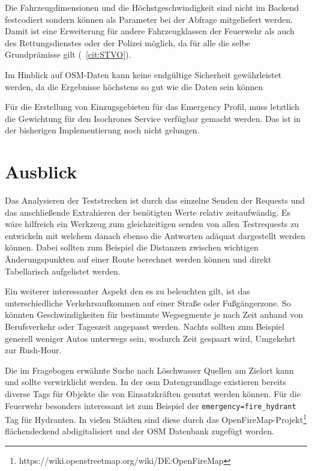 Die Fahrzeugdimensionen und die Höchstgeschwindigkeit sind nicht im Backend festcodiert sondern können als Parameter bei der Abfrage mitgeliefert werden.
Damit ist eine Erweiterung für andere Fahrzeugklassen der Feuerwehr als auch des Rettungsdienstes oder der Polizei möglich, da für alle die selbe Grundprämisse gilt (~\ref{cit:STVO}).

Im Hinblick auf OSM-Daten kann keine endgültige Sicherheit gewährleistet werden, da die Ergebnisse höchstens so gut wie die Daten sein können

Für die Erstellung von Einzugsgebieten für das Emergency Profil, muss letztlich die Gewichtung für den Isochrones Service verfügbar gemacht werden.
Das ist in der bisherigen Implementierung noch nicht gelungen.

\newpage
\section{Ausblick}


Das Analysieren der Teststrecken ist durch das einzelne Senden der Requests und das anschließende Extrahieren der benötigten Werte relativ zeitaufwändig.
Es wäre hilfreich ein Werkzeug zum gleichzeitigen senden von allen Testrequests zu entwickeln mit welchem danach ebenso die Antworten adäquat dargestellt werden können.
Dabei sollten zum Beispiel die Distanzen zwischen wichtigen Änderungspunkten auf einer Route berechnet werden können und direkt Tabellarisch aufgelistet werden.

Ein weiterer interessanter Aspekt den es zu beleuchten gilt, ist das unterschiedliche Verkehrsaufkommen auf einer Straße oder Fußgängerzone.
So könnten Geschwindigkeiten für bestimmte Wegsegmente je nach Zeit anhand von Berufsverkehr oder Tageszeit angepasst werden.
Nachts sollten zum Beispiel generell weniger Autos unterwegs sein, wodurch Zeit gespaart wird, Umgekehrt zur Rush-Hour.

Die im Fragebogen erwähnte Suche nach Löschwasser Quellen am Zielort kann und sollte verwirklicht werden.
In der \gls{osm} Datengrundlage existieren bereits diverse Tags für Objekte die von Einsatzkräften genutzt werden können.
Für die Feuerwehr besonders interessant ist zum Beispiel der \texttt{emergency=fire\_hydrant} Tag für Hydranten.
In vielen Städten sind diese durch das OpenFireMap-Projekt\footnote{https://wiki.openstreetmap.org/wiki/DE:OpenFireMap} flächendeckend abdigitalisiert und der OSM Datenbank zugefügt worden.